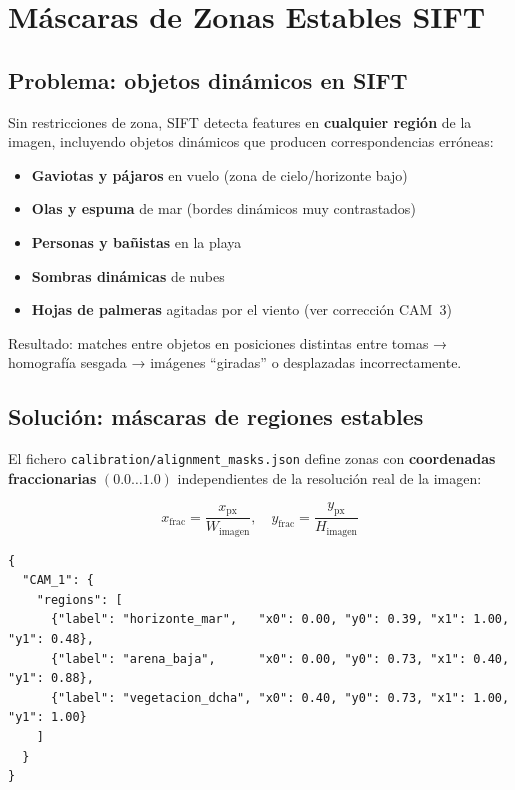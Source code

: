 \chapter{Máscaras de Zonas Estables SIFT}
\label{ch:masks}

\section{Problema: objetos dinámicos en SIFT}

Sin restricciones de zona, SIFT detecta features en \textbf{cualquier región} de la imagen,
incluyendo objetos dinámicos que producen correspondencias erróneas:

\begin{itemize}[leftmargin=1.5em]
  \item \textbf{Gaviotas y pájaros} en vuelo (zona de cielo/horizonte bajo)
  \item \textbf{Olas y espuma} de mar (bordes dinámicos muy contrastados)
  \item \textbf{Personas y bañistas} en la playa
  \item \textbf{Sombras dinámicas} de nubes
  \item \textbf{Hojas de palmeras} agitadas por el viento (ver corrección CAM~3)
\end{itemize}

Resultado: matches entre objetos en posiciones distintas entre tomas → homografía sesgada
→ imágenes ``giradas'' o desplazadas incorrectamente.

\section{Solución: máscaras de regiones estables}

El fichero \texttt{calibration/alignment\_masks.json} define zonas con \textbf{coordenadas
fraccionarias} $(0.0 \ldots 1.0)$ independientes de la resolución real de la imagen:

\begin{equation}
  x_\text{frac} = \frac{x_\text{px}}{W_\text{imagen}}, \quad
  y_\text{frac} = \frac{y_\text{px}}{H_\text{imagen}}
\end{equation}

\begin{codebox}
\begin{verbatim}
{
  "CAM_1": {
    "regions": [
      {"label": "horizonte_mar",   "x0": 0.00, "y0": 0.39, "x1": 1.00, "y1": 0.48},
      {"label": "arena_baja",      "x0": 0.00, "y0": 0.73, "x1": 0.40, "y1": 0.88},
      {"label": "vegetacion_dcha", "x0": 0.40, "y0": 0.73, "x1": 1.00, "y1": 1.00}
    ]
  }
}
\end{verbatim}
\end{codebox}

